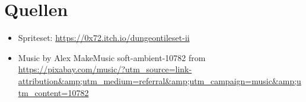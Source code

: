 \documentclass[12pt,a4paper]{article}
\begin{document}
\newpage

\section{Quellen}
\begin{itemize}
    \item Spriteset: \url{https://0x72.itch.io/dungeontileset-ii}
    \item Music by Alex MakeMusic soft-ambient-10782 from\\ \url{https://pixabay.com/music/?utm_source=link-attribution&amp;utm_medium=referral&amp;utm_campaign=music&amp;utm_content=10782}
\end{itemize}
\end{document}
